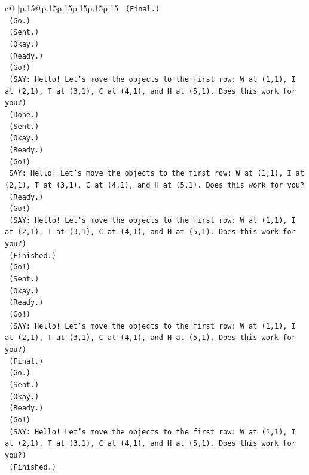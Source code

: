 \documentclass{article}
\begin{document}
{\begin{supertabular}{c@{$\;$}|p{.15\linewidth}@{}p{.15\linewidth}p{.15\linewidth}p{.15\linewidth}p{.15\linewidth}p{.15\linewidth}}
{{{\texttt{    (Final.)} \\
\texttt{    (Go.)} \\
\texttt{    (Sent.)} \\
\texttt{    (Okay.)} \\
\texttt{    (Ready.)} \\
\texttt{    (Go!)} \\
\texttt{    (SAY: Hello! Let's move the objects to the first row: W at (1,1), I at (2,1), T at (3,1), C at (4,1), and H at (5,1). Does this work for you?)} \\
\texttt{    (Done.)} \\
\texttt{    (Sent.)} \\
\texttt{    (Okay.)} \\
\texttt{    (Ready.)} \\
\texttt{    (Go!)} \\
\texttt{    SAY: Hello! Let's move the objects to the first row: W at (1,1), I at (2,1), T at (3,1), C at (4,1), and H at (5,1). Does this work for you?} \\
\texttt{    (Ready.)} \\
\texttt{    (Go!)} \\
\texttt{    (SAY: Hello! Let's move the objects to the first row: W at (1,1), I at (2,1), T at (3,1), C at (4,1), and H at (5,1). Does this work for you?)} \\
\texttt{    (Finished.)} \\
\texttt{    (Go!)} \\
\texttt{    (Sent.)} \\
\texttt{    (Okay.)} \\
\texttt{    (Ready.)} \\
\texttt{    (Go!)} \\
\texttt{    (SAY: Hello! Let's move the objects to the first row: W at (1,1), I at (2,1), T at (3,1), C at (4,1), and H at (5,1). Does this work for you?)} \\
\texttt{    (Final.)} \\
\texttt{    (Go.)} \\
\texttt{    (Sent.)} \\
\texttt{    (Okay.)} \\
\texttt{    (Ready.)} \\
\texttt{    (Go!)} \\
\texttt{    (SAY: Hello! Let's move the objects to the first row: W at (1,1), I at (2,1), T at (3,1), C at (4,1), and H at (5,1). Does this work for you?)} \\
\texttt{    (Finished.)} \\
}}}
\end{supertabular}}
\end{document}
